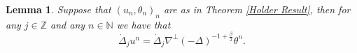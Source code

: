 \documentclass[12pt,xcolor=svgnames]{amsart}
\newtheorem{lemma}[theorem]{Lemma}
\newcommand{\R}{\mathbb{R}}
\newcommand{\abs}[1]{\mid\!#1\!\mid}
\begin{document}
\begin{lemma}
\label{Holder Space Frequency Equality} Suppose that $(u_n,\theta_n)_n$ are as in Theorem \ref{Holder Result}, then for any $j \in \mathbb{Z}$ and any $n \in \mathbb{N}$ we have that
$$
\dot{\Delta}_j u^n = \dot{\Delta}_j \nabla^{\perp}(-\Delta)^{-1+\frac{\beta}{2}}\theta^n.
$$
\end{lemma}
\end{document}
